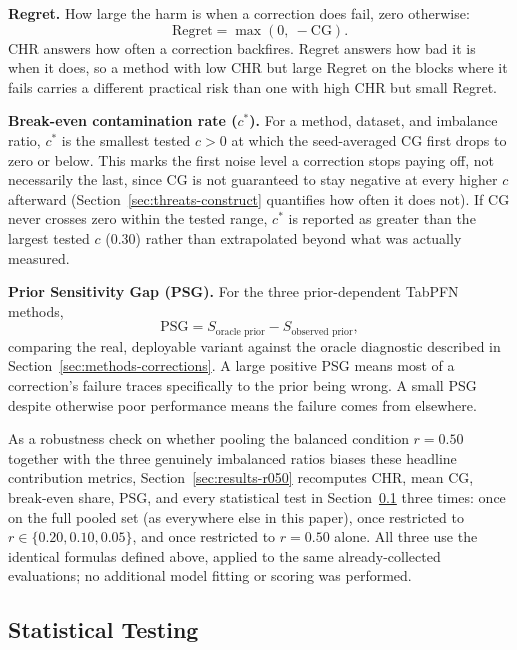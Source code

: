 \textbf{Regret.} How large the harm is when a correction does fail, zero
otherwise:
\begin{equation}
\text{Regret} = \max(0,\ -\text{CG}).
\label{eq:regret}
\end{equation}
CHR answers how often a correction backfires. Regret answers how bad it is
when it does, so a method with low CHR but large Regret on the blocks where it
fails carries a different practical risk than one with high CHR but small
Regret.

\textbf{Break-even contamination rate ($c^*$).} For a method, dataset, and
imbalance ratio, $c^*$ is the smallest tested $c > 0$ at which the
seed-averaged CG first drops to zero or below. This marks the first noise
level a correction stops paying off, not necessarily the last, since CG is
not guaranteed to stay negative at every higher $c$ afterward
(Section~\ref{sec:threats-construct} quantifies how often it does not). If
CG never crosses zero within the tested range, $c^*$ is reported as greater
than the largest tested $c$ (0.30) rather than extrapolated beyond what was
actually measured.

\textbf{Prior Sensitivity Gap (PSG).} For the three prior-dependent TabPFN
methods,
\begin{equation}
\text{PSG} = S_{\text{oracle prior}} - S_{\text{observed prior}},
\label{eq:psg}
\end{equation}
comparing the real, deployable variant against the oracle diagnostic
described in Section~\ref{sec:methods-corrections}. A large positive PSG
means most of a correction's failure traces specifically to the prior being
wrong. A small PSG despite otherwise poor performance means the failure comes
from elsewhere.

As a robustness check on whether pooling the balanced condition
$r{=}0.50$ together with the three genuinely imbalanced ratios biases
these headline contribution metrics, Section~\ref{sec:results-r050}
recomputes CHR, mean CG, break-even share, PSG, and every statistical
test in Section~\ref{sec:methods-statistics} three times: once on the
full pooled set (as everywhere else in this paper), once restricted to
$r \in \{0.20, 0.10, 0.05\}$, and once restricted to $r{=}0.50$ alone.
All three use the identical formulas defined above, applied to the same
already-collected evaluations; no additional model fitting or scoring
was performed.

\subsection{Statistical Testing}
\label{sec:methods-statistics}

